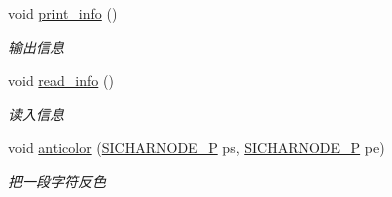 \begin{DoxyCompactItemize}
void \hyperlink{class_s_i_t_e_x_t_a9555644951be5d9def8c2a8d4843bf4c}{print\+\_\+info} ()
\begin{DoxyCompactList}\small\item\em 输出信息 \end{DoxyCompactList}\item 
\mbox{\label{class_s_i_t_e_x_t_acb96e6f11f61d17d4361d895614bfd2d}} 
void \hyperlink{class_s_i_t_e_x_t_acb96e6f11f61d17d4361d895614bfd2d}{read\+\_\+info} ()
\begin{DoxyCompactList}\small\item\em 读入信息 \end{DoxyCompactList}\item 
\mbox{\label{class_s_i_t_e_x_t_af62ce4105e9450cc8c2319fed9fa7218}} 
void \hyperlink{class_s_i_t_e_x_t_af62ce4105e9450cc8c2319fed9fa7218}{anticolor} (\hyperlink{class_s_i_c_h_a_r_n_o_d_e}{S\+I\+C\+H\+A\+R\+N\+O\+D\+E\+\_\+P} ps, \hyperlink{class_s_i_c_h_a_r_n_o_d_e}{S\+I\+C\+H\+A\+R\+N\+O\+D\+E\+\_\+P} pe)
\begin{DoxyCompactList}\small\item\em 把一段字符反色 \end{DoxyCompactList}\end{DoxyCompactItemize}
